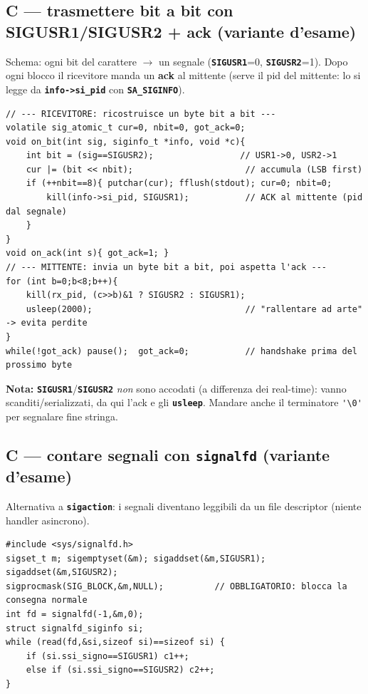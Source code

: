 \documentclass[10pt,a4paper]{article}
\newcommand{\fn}[1]{\texttt{\textbf{#1}}}
\begin{document}
\subsection{C --- trasmettere bit a bit con SIGUSR1/SIGUSR2 + ack (variante d'esame)}
Schema: ogni bit del carattere $\to$ un segnale (\fn{SIGUSR1}=0, \fn{SIGUSR2}=1). Dopo ogni blocco il ricevitore manda un \textbf{ack} al mittente (serve il pid del mittente: lo si legge da \fn{info->si\_pid} con \fn{SA\_SIGINFO}).
\begin{lstlisting}[style=c]
// --- RICEVITORE: ricostruisce un byte bit a bit ---
volatile sig_atomic_t cur=0, nbit=0, got_ack=0;
void on_bit(int sig, siginfo_t *info, void *c){
    int bit = (sig==SIGUSR2);                 // USR1->0, USR2->1
    cur |= (bit << nbit);                      // accumula (LSB first)
    if (++nbit==8){ putchar(cur); fflush(stdout); cur=0; nbit=0;
        kill(info->si_pid, SIGUSR1);           // ACK al mittente (pid dal segnale)
    }
}
void on_ack(int s){ got_ack=1; }
// --- MITTENTE: invia un byte bit a bit, poi aspetta l'ack ---
for (int b=0;b<8;b++){
    kill(rx_pid, (c>>b)&1 ? SIGUSR2 : SIGUSR1);
    usleep(2000);                              // "rallentare ad arte" -> evita perdite
}
while(!got_ack) pause();  got_ack=0;           // handshake prima del prossimo byte
\end{lstlisting}
\textbf{Nota:} \fn{SIGUSR1}/\fn{SIGUSR2} \emph{non} sono accodati (a differenza dei real-time): vanno scanditi/serializzati, da qui l'ack e gli \fn{usleep}. Mandare anche il terminatore \verb|'\0'| per segnalare fine stringa.

\subsection{C --- contare segnali con \fn{signalfd} (variante d'esame)}
Alternativa a \fn{sigaction}: i segnali diventano leggibili da un file descriptor (niente handler asincrono).
\begin{lstlisting}[style=c]
#include <sys/signalfd.h>
sigset_t m; sigemptyset(&m); sigaddset(&m,SIGUSR1); sigaddset(&m,SIGUSR2);
sigprocmask(SIG_BLOCK,&m,NULL);          // OBBLIGATORIO: blocca la consegna normale
int fd = signalfd(-1,&m,0);
struct signalfd_siginfo si;
while (read(fd,&si,sizeof si)==sizeof si) {
    if (si.ssi_signo==SIGUSR1) c1++;
    else if (si.ssi_signo==SIGUSR2) c2++;
}
\end{lstlisting}

\end{document}
